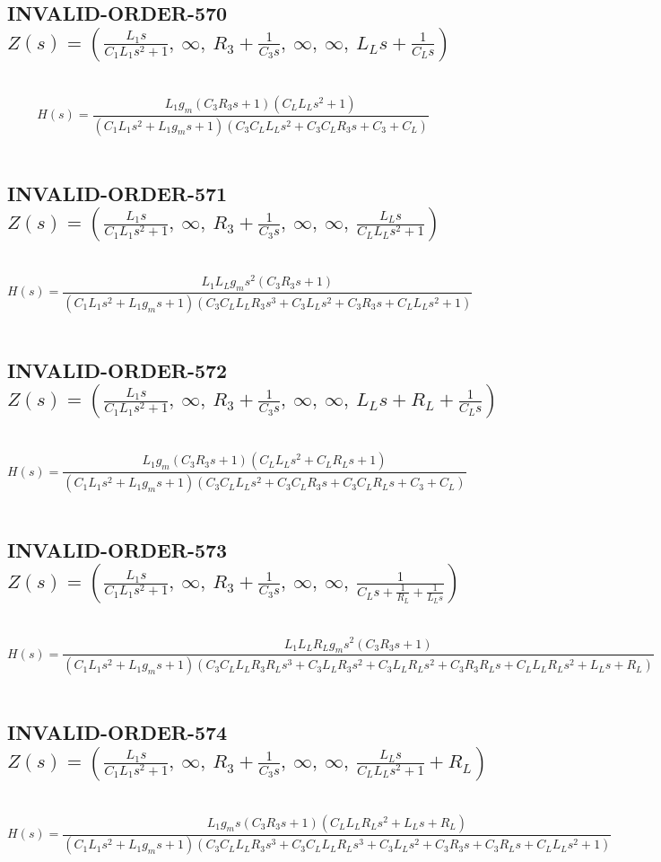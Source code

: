 \documentclass{article}
\begin{document}
\subsection{INVALID-ORDER-570 $Z(s) = \left( \frac{L_{1} s}{C_{1} L_{1} s^{2} + 1}, \  \infty, \  R_{3} + \frac{1}{C_{3} s}, \  \infty, \  \infty, \  L_{L} s + \frac{1}{C_{L} s}\right)$ } \ 
\textbf{\[H(s) = \frac{L_{1} g_{m} \left(C_{3} R_{3} s + 1\right) \left(C_{L} L_{L} s^{2} + 1\right)}{\left(C_{1} L_{1} s^{2} + L_{1} g_{m} s + 1\right) \left(C_{3} C_{L} L_{L} s^{2} + C_{3} C_{L} R_{3} s + C_{3} + C_{L}\right)}\] } \ 
\subsection{INVALID-ORDER-571 $Z(s) = \left( \frac{L_{1} s}{C_{1} L_{1} s^{2} + 1}, \  \infty, \  R_{3} + \frac{1}{C_{3} s}, \  \infty, \  \infty, \  \frac{L_{L} s}{C_{L} L_{L} s^{2} + 1}\right)$ } \ 
\textbf{\[H(s) = \frac{L_{1} L_{L} g_{m} s^{2} \left(C_{3} R_{3} s + 1\right)}{\left(C_{1} L_{1} s^{2} + L_{1} g_{m} s + 1\right) \left(C_{3} C_{L} L_{L} R_{3} s^{3} + C_{3} L_{L} s^{2} + C_{3} R_{3} s + C_{L} L_{L} s^{2} + 1\right)}\] } \ 
\subsection{INVALID-ORDER-572 $Z(s) = \left( \frac{L_{1} s}{C_{1} L_{1} s^{2} + 1}, \  \infty, \  R_{3} + \frac{1}{C_{3} s}, \  \infty, \  \infty, \  L_{L} s + R_{L} + \frac{1}{C_{L} s}\right)$ } \ 
\textbf{\[H(s) = \frac{L_{1} g_{m} \left(C_{3} R_{3} s + 1\right) \left(C_{L} L_{L} s^{2} + C_{L} R_{L} s + 1\right)}{\left(C_{1} L_{1} s^{2} + L_{1} g_{m} s + 1\right) \left(C_{3} C_{L} L_{L} s^{2} + C_{3} C_{L} R_{3} s + C_{3} C_{L} R_{L} s + C_{3} + C_{L}\right)}\] } \ 
\subsection{INVALID-ORDER-573 $Z(s) = \left( \frac{L_{1} s}{C_{1} L_{1} s^{2} + 1}, \  \infty, \  R_{3} + \frac{1}{C_{3} s}, \  \infty, \  \infty, \  \frac{1}{C_{L} s + \frac{1}{R_{L}} + \frac{1}{L_{L} s}}\right)$ } \ 
\textbf{\[H(s) = \frac{L_{1} L_{L} R_{L} g_{m} s^{2} \left(C_{3} R_{3} s + 1\right)}{\left(C_{1} L_{1} s^{2} + L_{1} g_{m} s + 1\right) \left(C_{3} C_{L} L_{L} R_{3} R_{L} s^{3} + C_{3} L_{L} R_{3} s^{2} + C_{3} L_{L} R_{L} s^{2} + C_{3} R_{3} R_{L} s + C_{L} L_{L} R_{L} s^{2} + L_{L} s + R_{L}\right)}\] } \ 
\subsection{INVALID-ORDER-574 $Z(s) = \left( \frac{L_{1} s}{C_{1} L_{1} s^{2} + 1}, \  \infty, \  R_{3} + \frac{1}{C_{3} s}, \  \infty, \  \infty, \  \frac{L_{L} s}{C_{L} L_{L} s^{2} + 1} + R_{L}\right)$ } \ 
\textbf{\[H(s) = \frac{L_{1} g_{m} s \left(C_{3} R_{3} s + 1\right) \left(C_{L} L_{L} R_{L} s^{2} + L_{L} s + R_{L}\right)}{\left(C_{1} L_{1} s^{2} + L_{1} g_{m} s + 1\right) \left(C_{3} C_{L} L_{L} R_{3} s^{3} + C_{3} C_{L} L_{L} R_{L} s^{3} + C_{3} L_{L} s^{2} + C_{3} R_{3} s + C_{3} R_{L} s + C_{L} L_{L} s^{2} + 1\right)}\] } \ 
\end{document}
